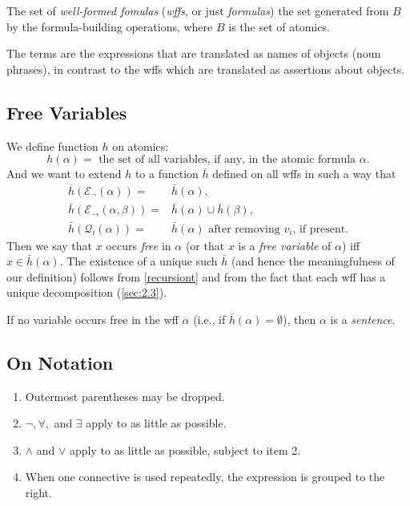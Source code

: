 The set of \textit{well-formed fomulas} (\textit{wffs}, or just \textit{formulas}) the set generated from $B$ by the formula-building operations, where $B$ is the set of atomics.

The terms are the expressions that are translated as names of objects (noun phrases), in contrast to the wffs which are translated as assertions about objects.

\subsection*{Free Variables}

We define function $h$ on atomics:
\[
  h(\alpha)=\text{ the set of all variables, if any, in the atomic formula }\alpha.
\]
And we want to extend $h$ to a function $\overline{h}$ defined on all wffs in such a way that
\begin{align*}
  \overline{h}(\mathcal{E}_{\neg}(\alpha))=         & \bar{h}(\alpha),                                         \\
  \bar{h}(\mathcal{E}_{\rightarrow}(\alpha,\beta))= & \bar{h}(\alpha)\cup\bar{h}(\beta),                       \\
  \bar{h}(\mathcal{Q}_i(\alpha))=                   & \bar{h}(\alpha)\text{ after removing $v_i$, if present.}
\end{align*}
Then we say that $x$ occurs \textit{free} in $\alpha$ (or that $x$ is a \textit{free variable} of $\alpha$) iff $x\in\bar{h}(\alpha)$. The existence of a unique such $\bar{h}$ (and hence the meaningfulness of our definition) follows from \ref{recursiont} and from the fact that each wff has a unique decomposition (\ref{sec:2.3}).

If no variable occurs free in the wff $\alpha$ (i.e., if $\bar{h}(\alpha)=\emptyset$), then $\alpha$ is a \textit{sentence}.

\subsection*{On Notation}
\label{sub: On Notation}

\begin{enumerate}
  \item Outermost parentheses may be dropped.
  \item $\neg,\forall,$ and $\exists$ apply to as little as possible.
  \item $\wedge$ and $\vee$ apply to as little as possible, subject to item 2.
  \item When one connective is used repeatedly, the expression is grouped to the right.
\end{enumerate}

